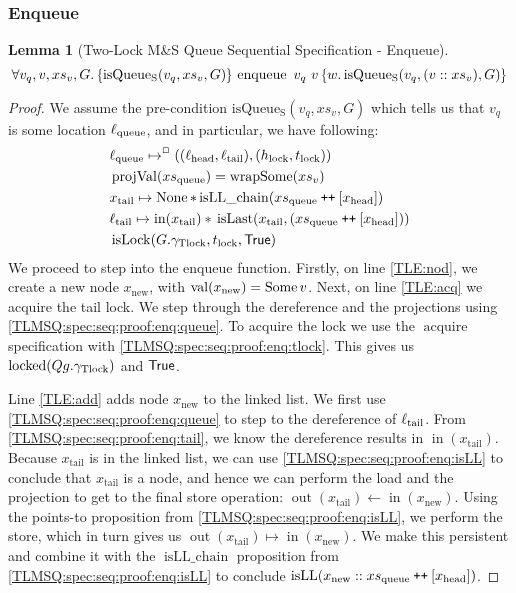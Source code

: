 \documentclass[a4paper, 10pt]{report}
\theoremstyle{definition}
\newtheorem{lemma}[theorem]{Lemma}
\newcommand{\isLock}{\operatorname{isLock}}
\newcommand{\locked}{\operatorname{locked}}
\newcommand{\acquire}{\operatorname{acquire}}
\newcommand{\enqueue}{\operatorname{enqueue}}
\newcommand{\msq}{M\&S Queue}
\newcommand{\tlmsq}{Two-Lock \msq{}}
\newcommand{\isqueueseq}{\operatorname{isQueue_{S}}}
\newcommand{\vq}{v_q}
\newcommand{\xsqueue}{xs_{\mathrm{queue}}}
\newcommand{\isLLchain}{\operatorname{isLL\_chain}}
\newcommand{\isLL}{\operatorname{isLL}}
\newcommand{\projval}{\operatorname{projVal}}
\newcommand{\wrapsome}{\operatorname{wrapSome}}
\newcommand{\isLast}{\operatorname{isLast}}
\newcommand{\locN}[1]{\loc_{\mathrm{#1}}}
\newcommand{\lochead}{\locN{head}}
\newcommand{\loctail}{\locN{tail}}
\newcommand{\locqueue}{\locN{queue}}
\newcommand{\nIn}[1]{\operatorname{in}(#1)}
\newcommand{\nVal}[1]{\operatorname{val}(#1)}
\newcommand{\nOut}[1]{\operatorname{out}(#1)}
\newcommand{\node}{x}
\newcommand{\nodeN}[1]{\node_{\mathrm{#1}}}
\newcommand{\nodehead}{\nodeN{head}}
\newcommand{\nodetail}{\nodeN{tail}}
\newcommand{\nodenew}{\nodeN{new}}
\newcommand{\absvalue}{\val}
\newcommand{\absvalueList}{xs_v}
\newcommand{\Hlock}{h_{\mathrm{lock}}}
\newcommand{\Tlock}{t_{\mathrm{lock}}}
\newcommand{\Qg}{G}
\newcommand{\gtlock}{\gname_{\mathrm{Tlock}}}
\newcommand\catenate{\mathbin{\text{\ttfamily\upshape ++}}}
\newcommand{\seqspecenqHT}[4]{\hoare{\isqueueseq(#1, #3, #4)}{\enqueue \ #1 \ #2}{\valB . \isqueueseq(#1, (#2 :: #3), #4)}}
\newcommand{\seqspecenqGen}[4]{\All #1, #2, #3, #4. \seqspecenqHT{#1}{#2}{#3}{#4}}
\newcommand{\seqspecenq}{\seqspecenqGen{\vq}{\absvalue}{\absvalueList}{\Qg}}
\begin{document}
\subsubsection{Enqueue}
\begin{lemma}[\tlmsq{} Sequential Specification - Enqueue]\label{TLMSQ:spec:seq:enqueue}
  \begin{equation*}
    \seqspecenq
  \end{equation*}
\end{lemma}
\begin{proof}
We assume the pre-condition $\isqueueseq(\vq, \absvalueList, \Qg)$ which tells us that $\vq$ is some location $\locqueue$, and in particular, we have following:
\begin{align}
  &\locqueue \mapsto^{\persistently} ((\lochead, \loctail), (\Hlock, \Tlock))\label{TLMSQ:spec:seq:proof:enq:queue}\\
  &\projval(\xsqueue) = \wrapsome(\absvalueList)\label{TLMSQ:spec:seq:proof:enq:rel}\\
  &\nodetail \mapsto \None \star{} \isLLchain (\xsqueue \catenate [\nodehead])\label{TLMSQ:spec:seq:proof:enq:isLL}\\
  &\loctail \mapsto \nIn{\nodetail} \star{} \isLast(\nodetail, (\xsqueue \catenate [\nodehead]))\label{TLMSQ:spec:seq:proof:enq:tail}\\
  &\isLock(\Qg.\gtlock, \Tlock, \TRUE)\label{TLMSQ:spec:seq:proof:enq:tlock}
\end{align}
We proceed to step into the enqueue function. Firstly, on line \ref{TLE:nod}, we create a new node $\nodenew$, with $\nVal{\nodenew} = \Some \absvalue$. Next, on line \ref{TLE:acq} we acquire the tail lock. We step through the dereference and the projections using \ref{TLMSQ:spec:seq:proof:enq:queue}. To acquire the lock we use the $\acquire$ specification with \ref{TLMSQ:spec:seq:proof:enq:tlock}. This gives us $\locked(Qg.\gtlock)$ and $\textsf{True}$.

Line \ref{TLE:add} adds node $\nodenew$ to the linked list. We first use \ref{TLMSQ:spec:seq:proof:enq:queue} to step to the dereference of $\loctail$. From \ref{TLMSQ:spec:seq:proof:enq:tail}, we know the dereference results in $\nIn{\nodetail}$. Because $\nodetail$ is in the linked list, we can use \ref{TLMSQ:spec:seq:proof:enq:isLL} to conclude that $\nodetail$ is a node, and hence we can perform the load and the projection to get to the final store operation: $\nOut{\nodetail} \gets \nIn{\nodenew}$. Using the points-to proposition from \ref{TLMSQ:spec:seq:proof:enq:isLL}, we perform the store, which in turn gives us $\nOut{\nodetail} \mapsto \nIn{\nodenew}$. We make this persistent and combine it with the $\isLLchain$ proposition from \ref{TLMSQ:spec:seq:proof:enq:isLL} to conclude $\isLL(\nodenew :: \xsqueue \catenate [\nodehead])$.


\end{proof}
\end{document}
